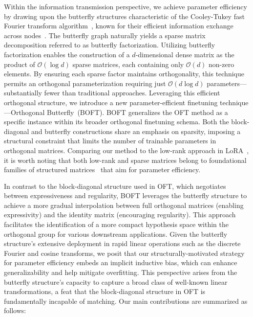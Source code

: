 Within the information transmission perspective, we achieve parameter efficiency by drawing upon the butterfly structures characteristic of the Cooley-Tukey fast Fourier transform algorithm~\cite{cooley1965algorithm}, known for their efficient information exchange across nodes~\cite{klasing1994broadcasting}. The butterfly graph naturally yields a sparse matrix decomposition referred to as butterfly factorization. Utilizing butterfly factorization enables the construction of a $d$-dimensional dense matrix as the product of $\mathcal{O}(\log d)$ sparse matrices, each containing only $\mathcal{O}(d)$ non-zero elements. By ensuring each sparse factor maintains orthogonality, this technique permits an orthogonal parameterization requiring just $\mathcal{O}(d\log d)$ parameters—substantially fewer than traditional approaches. Leveraging this efficient orthogonal structure, we introduce a new parameter-efficient finetuning technique—Orthogonal Butterfly~(BOFT). BOFT generalizes the OFT method as a specific instance within its broader orthogonal finetuning schema. Both the block-diagonal and butterfly constructions share an emphasis on sparsity, imposing a structural constraint that limits the number of trainable parameters in orthogonal matrices. Comparing our method to the low-rank approach in LoRA~\cite{hulora2022}, it is worth noting that both low-rank and sparse matrices belong to foundational families of structured matrices~\cite{candes2011robust} that aim for parameter efficiency.

In contrast to the block-diagonal structure used in OFT, which negotiates between expressiveness and regularity, BOFT leverages the butterfly structure to achieve a more gradual interpolation between full orthogonal matrices (enabling expressivity) and the identity matrix (encouraging regularity). This approach facilitates the identification of a more compact hypothesis space within the orthogonal group for various downstream applications. Given the butterfly structure’s extensive deployment in rapid linear operations such as the discrete Fourier and cosine transforms, we posit that our structurally-motivated strategy for parameter efficiency embeds an implicit inductive bias, which can enhance generalizability and help mitigate overfitting. This perspective arises from the butterfly structure's capacity to capture a broad class of well-known linear transformations, a feat that the block-diagonal structure in OFT is fundamentally incapable of matching. Our main contributions are summarized as follows:

